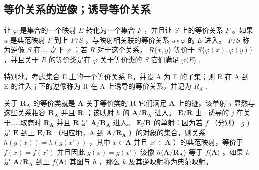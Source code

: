 \subsection{等价关系的逆像；诱导等价关系}

让 \(\varphi\) 是集合的一个映射 \(E\) 转化为一个集合 \(F\) ，并且让 \(S\) 上的等价关系 \(F\) 。如果 \(u\) 是典范映射 \(F\) 到上 \(F/S\) ，与映射相关联的等价关系 \(u \circ \varphi\) 的 \(E\) 进入。 \(F/S\) 称为逆像 \(S\) 在……之下 \(\varphi\) ；若 \(R\) 对于这个关系， \(R\{x, y\}\) 等价于 \(S\{\varphi(x), \varphi(y)\}\) ，并且关于 \(R\) 的等价类是在 \(\varphi\) 关于等价类的 \(S\) 它们满足 \(\varphi\langle E\rangle\) .

特别地，考虑集合 E 上的一个等价关系 R，并设 A 为 E 的子集；则 R 在 A 到 E 的注入 j 下的逆像称为 R 在 A 上诱导的等价关系，并记为 \(R_{A}\) .

关于 \(\mathbf{R}_{\mathbf{A}}\) 的等价类就是 \(\mathbf{A}\) 关于等价类的 \(\mathbf{R}\) 它们满足 \(\mathbf{A}\) 上的迹。该单射 \(j\) 显然与这些关系相容 \(\mathbf{R}_{\mathbf{A}}\) 并且 \(\mathbf{R}\) ；该映射 \(h\) 的 \(\mathbf{A} / \mathbf{R}_{\mathbf{A}}\) 进入。 \(\mathbf{E} / \mathbf{R}\) 由...诱导的 \(j\) 在关于……取商时 \(\mathbf{R}_{\mathbf{A}}\) 并且 \(\mathbf{R}\) 是 \(\mathbf{A} / \mathbf{R}_{\mathbf{A}}\) 进入。 \(\mathbf{E} / \mathbf{R}\) 的单射：因为若 \(f\) （分别） \(g\) ) 是 \(\mathbf{E}\) 到上 \(\mathbf{E} / \mathbf{R}\) （相应地，A 到 \(\mathbf{A} / \mathbf{R}_{\mathbf{A}}\) ）的对象的集合，则关系 \(h(g(x)) = h(g(x'))\) ，其中 \(x \in \mathbf{A}\) 并且 \(x' \in \mathbf{A}\) ）的典范映射，等价于 \(f(x) = f(x')\) 并且因此 \(g(x) = g(x')\) 该像 \(h\langle \mathbf{A} / \mathbf{R}_{\mathbf{A}} \rangle\) 等于 \(f\langle \mathbf{A} \rangle\) 。如果 \(k\) 是 \(\mathbf{A} / \mathbf{R}_{\mathbf{A}}\) 到上 \(f\langle \mathbf{A} \rangle\) 其图与 \(h\) ，那么 \(k\) 及其逆映射称为典范映射。

